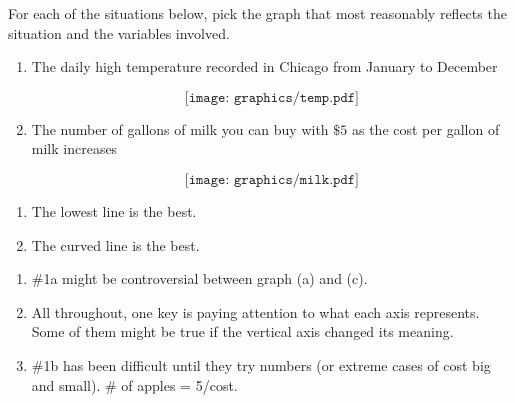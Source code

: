 \documentclass{ximera}
\begin{document}
\begin{problem}
For each of the situations below, pick the graph that most reasonably
reflects the situation and the variables involved.

\begin{enumerate}
\item The daily high temperature recorded in Chicago from January to
  December

\[
\texttt{[image: graphics/temp.pdf]}
\]

\item The number of gallons of milk you can buy with $\$5$ as the cost per gallon of
  milk increases

\[
\texttt{[image: graphics/milk.pdf]}
\]

\end{enumerate}



\begin{solution}
\begin{enumerate}
\item The lowest line is the best.
\item The curved line is the best.
\end{enumerate}
\end{solution}

\begin{instructorNotes}
\begin{enumerate}
    \item \#1a might be controversial between graph (a) and (c).
    \item All throughout, one key is paying attention to what each axis represents.  Some of them might be true if the vertical axis changed its meaning.
    \item \#1b has been difficult until they try numbers (or extreme cases of cost big and small).  \# of apples = 5/cost.
\end{enumerate}
\end{instructorNotes}




\end{problem}
\end{document}
